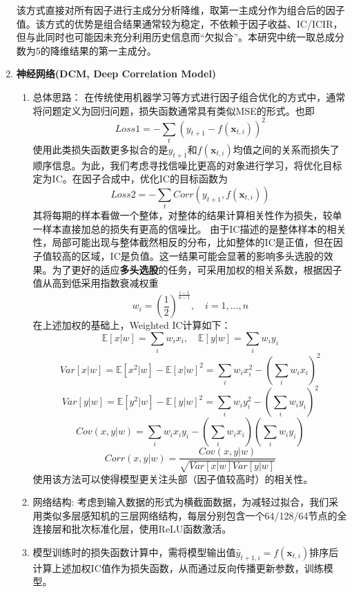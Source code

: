 \documentclass[11pt]{article}
\begin{document}
\begin{enumerate}
该方式直接对所有因子进行主成分分析降维，取第一主成分作为组合后的因子值。该方式的优势是组合结果通常较为稳定，不依赖于因子收益、IC/ICIR，但与此同时也可能因未充分利用历史信息而“欠拟合”。本研究中统一取总成分数为5的降维结果的第一主成分。
\item \textbf{神经网络(DCM, Deep Correlation Model)}

\begin{enumerate}
    \item 总体思路：
    在传统使用机器学习等方式进行因子组合优化的方式中，通常将问题定义为回归问题，损失函数通常具有类似MSE的形式。也即$$Loss1=-\sum_t (y_{t+1} - f(\bm{x}_{t,i}))^2$$ 使用此类损失函数更多拟合的是$y_{t+1}$和$f(\bm{x}_{t,i})$均值之间的关系而损失了顺序信息。为此，我们考虑寻找信噪比更高的对象进行学习，将优化目标定为IC。在因子合成中，优化IC的目标函数为
$$Loss2=-\sum_t Corr(y_{t+1}, f(\bm{x}_{t,i}))$$ 其将每期的样本看做一个整体，对整体的结果计算相关性作为损失，较单一样本直接加总的损失有更高的信噪比。
由于IC描述的是整体样本的相关性，局部可能出现与整体截然相反的分布，比如整体的IC是正值，但在因子值较高的区域，IC是负值。这一结果可能会显著的影响多头选股的效果。为了更好的适应\textbf{多头选股}的任务，可采用加权的相关系数，根据因子值从高到低采用指数衰减权重
$$w_i=\left(\frac{1}{2}\right)^{\frac{i-1}{n-1}}, \quad i=1,\dots,n$$ 在上述加权的基础上，Weighted IC计算如下：
$$\mathbb{E}[x|w]=\sum_i w_i x_i, \quad \mathbb{E}[y|w]=\sum_i w_i y_i$$ $$Var[x|w]=\mathbb{E}[x^2|w]-\mathbb{E}[x|w]^2=\sum_i w_i x_i^2-\left(\sum_i w_i x_i\right)^2$$ $$Var[y|w]=\mathbb{E}[y^2|w]-\mathbb{E}[y|w]^2=\sum_i w_i y_i^2-\left(\sum_i w_i y_i\right)^2$$ $$Cov(x,y|w)=\sum_i w_i x_i y_i - \left(\sum_i w_i x_i\right)\left(\sum_i w_i y_i\right)$$ $$Corr(x,y|w)=\frac{Cov(x,y|w)}{\sqrt{Var[x|w]Var[y|w]}}$$ 使用该方法可以使得模型更关注头部（因子值较高时）的相关性。
\item 网络结构: 
考虑到输入数据的形式为横截面数据，为减轻过拟合，我们采用类似多层感知机的三层网络结构，每层分别包含一个64/128/64节点的全连接层和批次标准化层，使用ReLU函数激活。
\item 模型训练时的损失函数计算中，需将模型输出值$\hat{y}_{t+1,i}=f(\bm{x}_{t,i})$排序后计算上述加权IC值作为损失函数，从而通过反向传播更新参数，训练模型。
\end{enumerate}

\end{enumerate}
\end{document}
